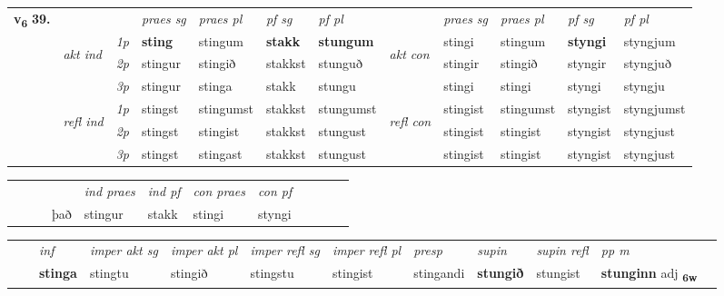 \begin{tabular}{llllllllllll} \toprule
\multirow{4}{*}{{{\textbf{v{\textsubscript{6}}} \Large{\textbf{39.}}}}}  & &   &  \textit{praes sg}  & \textit{praes pl}  &\textit{ pf sg} & \textit{pf pl} &  &  \textit{praes sg}  & \textit{praes pl}  & \textit{pf sg} & \textit{pf pl } \\*
	\cmidrule{4-7} \cmidrule{9-12}
 & \multirow{3}{*}{\begin{turn}{90}\textit{akt ind}\end{turn}} & {\textit{1p}} & \textbf{sting} & stingum    & \textbf{stakk} & \textbf{stungum} & \multirow{3}{*}{\begin{turn}{90}\textit{akt con}\end{turn}} &stingi & stingum & \textbf{styngi} & styngjum\\*
& &  {\textit{2p}} &  stingur  & stingið   & stakkst & stunguð & & stingir & stingið & styngir & styngjuð \\*
& &  {\textit{3p}} & stingur & stinga   & stakk & stungu & & stingi & stingi& styngi & styngju  \\*
\cmidrule{4-7} \cmidrule{9-12}
 &\multirow{3}{*}{\begin{turn}{90}\textit{refl ind}\end{turn}} & {\textit{1p}} & stingst & stingumst    & stakkst & stungumst & \multirow{3}{*}{\begin{turn}{90}\textit{refl con}\end{turn}}  &stingist & stingumst & styngist & styngjumst\\*
 &&  {\textit{2p}} &  stingst  & stingist   & stakkst & stungust & &stingist & stingist & styngist & styngjust \\*
& &  {\textit{3p}} & stingst & stingast   & stakkst & stungust & & stingist & stingist& styngist & styngjust  \\*
\cmidrule{4-7} \cmidrule{9-12}
\end{tabular}


\begin{tabular}{llllllllllll}
 & &  & &  \textit{ind praes} & \textit{ind pf} & \textit{con praes} & \textit{con pf} \\*
&  & & það & stingur & stakk & stingi & styngi \\*
\cmidrule{5-9}
\end{tabular}


\begin{tabular}{llllllllllll}
 & & \textit{inf} & \textit{imper akt sg} & \textit{imper akt pl} & \textit{imper refl sg} & \textit{imper refl pl} & \textit{presp} & \textit{supin} & \textit{supin refl} & \textit{pp m}     \\*
  & & \textbf{stinga} & stingtu  & stingið & stingstu & stingist & stingandi &  \textbf{stungið} & stungist & \textbf{stunginn} adj \textbf{\textsubscript{6w}} \\*
\cmidrule{1-12}
\end{tabular}




